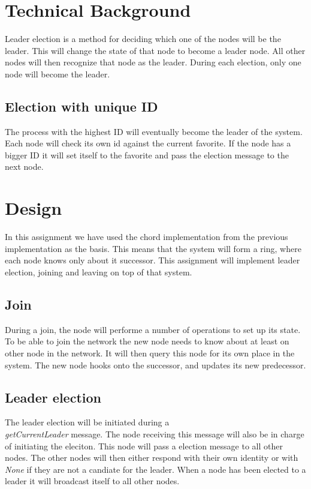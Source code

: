 \section{Technical Background}
Leader election is a method for deciding which one of the nodes will be the leader. This will change the state of that node to become a leader node.
All other nodes will then recognize that node as the leader. During each election, only one node will become the leader.

\subsection{Election with unique ID}
The process with the highest ID will eventually become the leader of the system. Each node will check its own id against the current
favorite. If the node has a bigger ID it will set itself to the favorite and pass the election message to the next node.

\section{Design}
In this assignment we have used the chord implementation from the previous implementation as the basis.
This means that the system will form a ring, where each node knows only about it successor.
This assignment will implement leader election, joining and leaving on top of that system.
\subsection{Join}
During a join, the node will performe a number of operations to set up its state.
To be able to join the network the new node needs to know about at least on other node in the network.
It will then query this node for its own place in the system.
The new node hooks onto the successor, and updates its new predecessor.

\subsection{Leader election}
The leader election will be initiated during a \textit{\\getCurrentLeader} message. The node receiving this message will also be in charge
of initiating the eleciton. This node will pass a election message to all other nodes. The other nodes will then either respond with their own identity or with \textit{None} if they are not a candiate for the leader. When a node has been elected to a leader it will broadcast itself to all other nodes.


